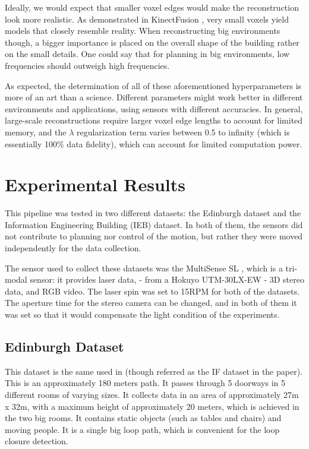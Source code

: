 \documentclass[11pt]{article}
\begin{document}
Ideally, we would expect that smaller voxel edges would make the reconstruction look more realistic. As demonstrated in KinectFusion \cite{kinectfusion}, very small voxels yield models that closely resemble reality. When reconstructing big environments though, a bigger importance is placed on the overall shape of the building rather on the small details. One could say that for planning in big environments, low frequencies should outweigh high frequencies. 

As expected, the determination of all of these aforementioned hyperparameters is more of an art than a science. Different parameters might work better in different environments and applications, using sensors with different accuracies. In general, large-scale reconstructions require larger voxel edge lengths to account for limited memory, and the $\lambda$ regularization term varies between 0.5 to infinity (which is essentially 100\% data fidelity), which can account for limited computation power.
			
	\newpage
	\section{Experimental Results}
	\label{subs:experiments}

This pipeline was tested in two different datasets: the Edinburgh dataset and the Information Engineering Building (IEB) dataset. In both of them, the sensors did not contribute to planning nor control of the motion, but rather they were moved independently for the data collection.
	
The sensor used to collect these datasets was the MultiSense SL \cite{multisense}, which is a tri-modal sensor: it provides laser data, - from a Hokuyo UTM-30LX-EW \cite{HokuyoDataSheet}- 3D stereo data, and RGB video. The laser spin was set to 15RPM for both of the datasets. The aperture time for the stereo camera can be changed, and in both of them it was set so that it would compensate the light condition of the experiments. 
	
	\subsection{Edinburgh Dataset}

This dataset is the same used in \cite{AICPAlign} (though referred as the IF dataset in the paper). This is an approximately 180 meters path. It passes through 5 doorways in 5 different rooms of varying sizes. It collects data in an area of approximately 27m x 32m, with a maximum height of approximately 20 meters, which is achieved in the two big rooms. It contains static objects (such as tables and chairs) and moving people. It is a single big loop path, which is convenient for the loop closure detection.
	
\end{document}
